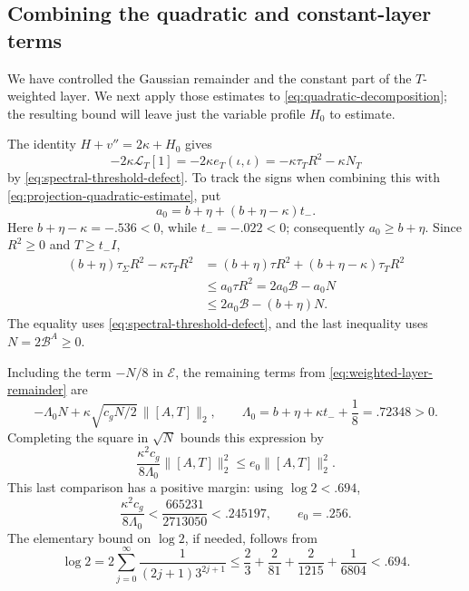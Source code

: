\subsection{Combining the quadratic and constant-layer terms}

We have controlled the Gaussian remainder and the constant part of the $T$-weighted layer.  We next apply those estimates to \eqref{eq:quadratic-decomposition}; the resulting bound will leave just the variable profile $H_0$ to estimate.

The identity $H+v''=2\kappa+H_0$ gives
\[
 -2\kappa\mathcal{L}_T[1]
 =-2\kappa e_T(\iota,\iota)
 =-\kappa\tau_T R^2-\kappa N_T
\]
by \eqref{eq:spectral-threshold-defect}. To track the signs when combining this with \eqref{eq:projection-quadratic-estimate}, put
\[
 a_0=b+\eta+(b+\eta-\kappa)t_-.
\]
Here $b+\eta-\kappa=-.536<0$, while $t_-=-.022<0$; consequently $a_0\ge b+\eta$. Since $R^2\ge0$ and $T\ge t_-I$,
\[
 \begin{aligned}
 (b+\eta)\tau_\Sigma R^2-\kappa\tau_T R^2
 &=(b+\eta)\tau R^2+(b+\eta-\kappa)\tau_T R^2\\
 &\le a_0\tau R^2
   =2a_0\mathcal{B}-a_0N\\
 &\le 2a_0\mathcal{B}-(b+\eta)N.
 \end{aligned}
\]
The equality uses \eqref{eq:spectral-threshold-defect}, and the last inequality uses $N=2\mathcal{B}^A\ge0$.

Including the term $-N/8$ in $\mathcal{E}$, the remaining terms from \eqref{eq:weighted-layer-remainder} are
\[
 -\Lambda_0N+\kappa\sqrt{c_gN/2}\,\|[A,T]\|_2,\qquad
 \Lambda_0=b+\eta+\kappa t_-+\frac18=.72348>0.
\]
Completing the square in $\sqrt N$ bounds this expression by
\[
 \frac{\kappa^2c_g}{8\Lambda_0}\|[A,T]\|_2^2
 \le e_0\|[A,T]\|_2^2.
\]
This last comparison has a positive margin: using $\log2<.694$,
\[
 \frac{\kappa^2c_g}{8\Lambda_0}
 <\frac{665231}{2713050}<.245197,
 \qquad e_0=.256.
\]
The elementary bound on $\log2$, if needed, follows from
\[
 \log2=2\sum_{j=0}^\infty
              \frac1{(2j+1)3^{2j+1}}
 \le \frac23+\frac2{81}+\frac2{1215}+\frac1{6804}<.694.
\]

